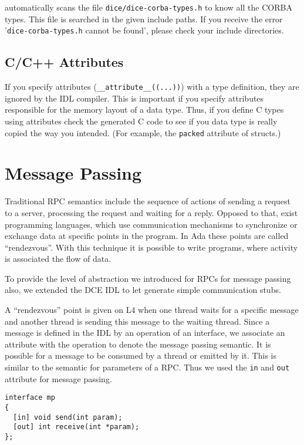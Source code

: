\dice{} automatically scans the file \verb|dice/dice-corba-types.h| to know
all the CORBA types. This file is searched in the given include paths.  If you
receive the error '\verb|dice-corba-types.h| cannot be found', please check
your include directories.

\subsection{C/C++ Attributes}

If you specify attributes (\verb|__attribute__((...))|) with a type
definition, they are ignored by the IDL compiler. This is important if you
specify attributes responsible for the memory layout of a data type. Thus, if
you define C types using attributes check the generated C code to see if you
data type is really copied the way you intended. (For example, the
\verb|packed| attribute of structs.)

\section{Message Passing}
\label{sec:message-passing}

Traditional RPC semantics include the sequence of actions of sending a request
to a server, processing the request and waiting for a reply.  Opposed to that,
exist programming languages, which use communication mechanisms to synchronize
or exchange data at specific points in the program. In Ada these points are
called ``rendezvous''. With this technique it is possible to write programs,
where activity is associated the flow of data.

To provide the level of abstraction we introduced for RPCs for message passing
also, we extended the DCE IDL to let \dice{} generate simple communication
stubs.

A ``rendezvous'' point is given on L4 when one thread waits for a specific
message and another thread is sending this message to the waiting thread.
Since a message is defined in the IDL by an operation of an interface, we
associate an attribute with the operation to denote the message passing
semantic. It is possible for a message to be consumed by a thread or emitted
by it. This is similar to the semantic for parameters of a RPC. Thus we used
the \verb|in| and \verb|out| attribute for message passing.

\begin{verbatim}
interface mp
{
  [in] void send(int param);
  [out] int receive(int *param);
};
\end{verbatim}

